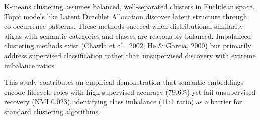 K-means clustering \citep{Lloyd1982Kmeans} assumes balanced, well-separated clusters in Euclidean space. Topic models like Latent Dirichlet Allocation \citep{Blei2003} discover latent structure through co-occurrence patterns. These methods succeed when distributional similarity aligns with semantic categories and classes are reasonably balanced. Imbalanced clustering methods exist (Chawla et al., 2002; He \& Garcia, 2009) but primarily address supervised classification rather than unsupervised discovery with extreme imbalance ratios.

This study contributes an empirical demonstration that semantic embeddings encode lifecycle roles with high supervised accuracy (79.6\%) yet fail unsupervised recovery (NMI 0.023), identifying class imbalance (11:1 ratio) as a barrier for standard clustering algorithms.

